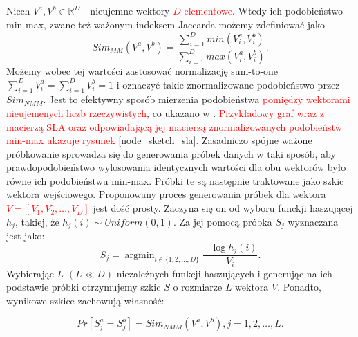             Niech $V^a, V^b \in \mathbb{R}_{+}^{D}$ - nieujemne wektory \textcolor{red}{$D$-elementowe}. Wtedy ich podobieństwo min-max, zwane też ważonym indeksem Jaccarda możemy zdefiniować jako 
            \begin{equation} \label{eq:sim_mm}  
                Sim_{MM}(V^a, V^b) = \frac{\sum \limits_{i = 1}^D min(V_i^{a}, V_i^{b})}{\sum \limits_{i = 1}^D max(V_i^{a}, V_i^{b})}.
            \end{equation}
            Możemy wobec tej wartości zastosować normalizację sum-to-one $\sum \limits_{i = 1}^D V_{i}^{a} = \sum \limits_{i = 1}^D V_{i}^{b} = 1$ i oznaczyć takie znormalizowane podobieństwo przez $Sim_{NMM}$. Jest to efektywny sposób mierzenia podobieństwa \textcolor{red}{pomiędzy wektorami nieujemenych liczb rzeczywistych}, co ukazano w \cite{10.1145/2783258.2783406}. \textcolor{red}{Przykładowy graf wraz z macierzą SLA oraz odpowiadającą jej macierzą znormalizowanych podobieństw min-max ukazuje rysunek \ref{node_sketch_sla}.} Zasadniczo spójne ważone próbkowanie sprowadza się do generowania próbek danych w taki sposób, aby prawdopodobieństwo wylosowania identycznych wartości dla obu wektorów było równe ich podobieństwu min-max. Próbki te są następnie traktowane jako szkic wektora wejściowego. Proponowany proces generowania próbek dla wektora \textcolor{red}{$V = [V_1, V_2, \dots, V_D]$} jest dość prosty. Zaczyna się on od wyboru funckji haszującej $h_j$, takiej, że $h_j(i) \sim Uniform(0,1)$. Za jej pomocą próbka $S_j$ wyznaczana jest jako:
            \begin{equation} \label{eq:node_sketch_1}  
                S_j = \mathop{argmin}_{i \in \{1,2,\dots, D\}} \frac{-\log h_{j}(i)}{V_i}.
            \end{equation}
            Wybierając $L$ $(L \ll D)$ niezależnych funkcji haszujących i generując na ich podstawie próbki otrzymujemy szkic $S$ o rozmiarze $L$ wektora $V$. Ponadto, wynikowe szkice zachowują własność:

            \begin{equation} \label{eq:node_sketch_2}  
                Pr[S_{j}^{a} = S_{j}^{b}] = Sim_{NMM}(V^a, V^b), j = 1,2,\dots,L.
            \end{equation}

